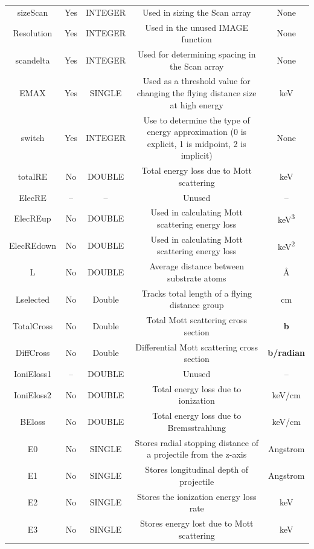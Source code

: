 \documentclass[10pt, reqno]{exam}
\begin{document}
{\begin{longtable}{|c|c|c|c|c|}
        sizeScan & Yes & INTEGER & Used in sizing the Scan array & None \\
        Resolution & Yes & INTEGER & Used in the unused IMAGE function & None \\
        scandelta & Yes & INTEGER & Used for determining spacing in the Scan array & None \\
        EMAX & Yes & SINGLE & Used as a threshold value for changing the flying distance size at high energy &  keV \\
        switch & Yes & INTEGER & Use to determine the type of energy approximation (0 is explicit, 1 is midpoint, 2 is implicit) & None \\
        \hline
        totalRE & No & DOUBLE & Total energy loss due to Mott scattering & keV \\
        ElecRE  & -- & --  & Unused  & --  \\
        ElecREup    & No  & DOUBLE  & Used in calculating Mott scattering energy loss  & \si{keV^3}  \\
        ElecREdown  &  No & DOUBLE  &  Used in calculating Mott scattering energy loss & \si{keV^2}  \\
        L   &  No & DOUBLE  & Average distance between substrate atoms  & \si{\angstrom}  \\
        Lselected   & No  &  Double & Tracks total length of a flying distance group  & \si{\cm}  \\
        TotalCross  & No  &  Double & Total Mott scattering cross section &  \textbf{b} \\
        DiffCross  & No & Double & Differential Mott scattering cross section &  \textbf{b/radian} \\
        IoniEloss1  &  -- & DOUBLE  &  Unused & --  \\
        IoniEloss2  & No  &  DOUBLE & Total energy loss due to ionization & keV/cm  \\
        BEloss  & No  & DOUBLE  & Total energy loss due to Bremsstrahlung  & keV/cm  \\
        E0  & No & SINGLE  & Stores radial stopping distance of a projectile from the z-axis & Angstrom \\
        E1  & No  & SINGLE  & Stores longitudinal depth of projectile & Angstrom  \\
        E2  & No & SINGLE  & Stores the ionization energy loss rate  & keV \\
        E3  & No & SINGLE  & Stores energy lost due to Mott scattering  & keV  \\

\end{longtable}}
\end{document}

